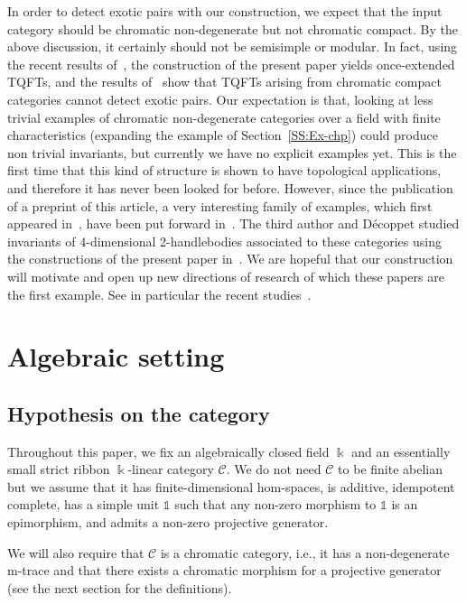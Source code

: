 \documentclass[pdftex]{sigma}
\numberwithin{equation}{section}
\numberwithin{theorem}{section}
\numberwithin{proposition}{section}
\numberwithin{definition}{section}
\numberwithin{lemma}{section}
\numberwithin{corollary}{section}
\numberwithin{remark}{section}
\numberwithin{example}{section}
\newcommand{\cat}{\mathcal{C}}
\newcommand{\unit}{\ensuremath{\mathds{1}}}
\newcommand{\FK}{{\Bbbk}}
\newcounter{exo} \newcounter{numexercice}
\begin{document}
In order to detect exotic pairs with our construction, we expect that the input category should be chromatic non-degenerate but not chromatic compact.
By the above discussion, it certainly should not be semisimple or modular.
In fact, using the recent results of~\cite{HaiounWRT}, the construction of the present paper yields once-extended TQFTs, and the results of~\cite{Reutter} show that TQFTs arising from chromatic compact categories cannot detect exotic pairs.
Our expectation is that, looking at less trivial examples of chromatic non-degenerate categories over a field with finite characteristics (expanding the example of Section~\ref{SS:Ex-chp}) could produce non trivial invariants, but currently we have no explicit examples yet.
This is the first time that this kind of structure is shown to have topological applications, and therefore it has never been looked for before. However, since the publication of a preprint of this article, a very interesting family of examples, which first appeared in~\cite{STWZ23}, have been put forward in~\cite{Decoppet}. The third author and D\'ecoppet studied invariants of 4-dimensional 2-handlebodies associated to these categories using the constructions of the present paper in~\cite{DH2HB}. We are hopeful that our construction will motivate and open up new directions of research of which these papers are the first example. See in particular the recent studies~\cite{FaesManko, Manko}.

\section{Algebraic setting}%
\subsection{Hypothesis on the category}\label{SS:Hypothesiscat}
Throughout this paper, we fix an algebraically closed field $\FK$ and
an essentially small strict ribbon $\FK$-linear
category $\cat$. We do not need $\cat$ to be finite abelian but we
assume that it has finite-dimensional hom-spaces, is additive,
idempotent complete, has a simple unit $\unit$ such that any non-zero
morphism to $\unit$ is an epimorphism, and admits a non-zero projective
generator.

We will also require that $\cat$ is a chromatic category, i.e., it has a
non-degenerate m-trace and that there exists a chromatic morphism for a projective generator (see the
next section for the definitions).
\end{document}
